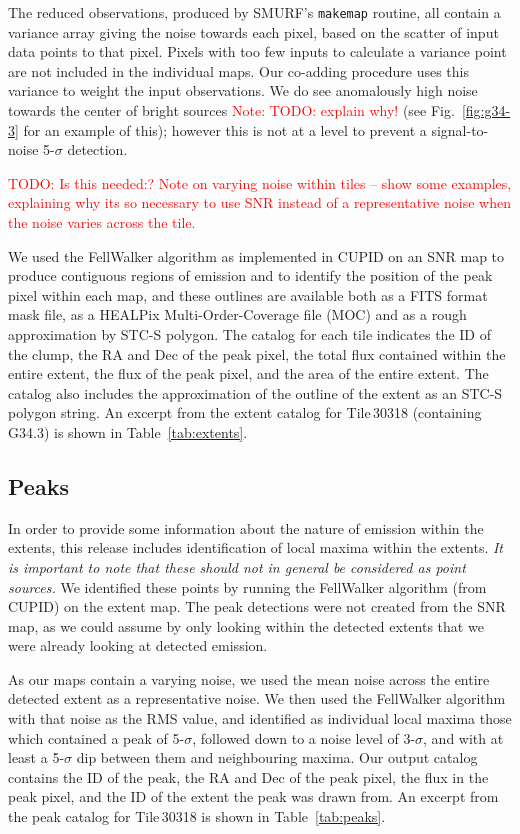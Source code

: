 \documentclass[twocolumn,times]{aastex6}
\newcommand{\todo}[1]{\textcolor{red}{TODO: #1}}
\newcommand{\note}[1]{\textcolor{red}{Note: #1}}
\begin{document}
The reduced observations, produced by SMURF's \texttt{makemap} routine, all
contain a variance array giving the noise towards each pixel, based on
the scatter of input data points to that pixel. Pixels with too few
inputs to calculate a variance point are not included in
the individual maps. Our co-adding procedure uses this variance to
weight the input observations. We do see anomalously high noise
towards the center of bright sources \note{TODO: explain why!} (see
Fig.~\ref{fig:g34-3} for an example of this); however this is not at a
level to prevent a signal-to-noise 5-$\sigma$ detection.

\todo{Is this needed:? Note on varying noise within tiles -- show some examples,
  explaining why its so necessary to use SNR instead of a
  representative noise when the noise varies across the tile.}

We used the FellWalker algorithm as implemented in CUPID on an SNR map
to produce contiguous regions of emission and to identify the position
of the peak pixel within each map, and these outlines are available
both as a FITS format mask file, as a HEALPix Multi-Order-Coverage
file (MOC) and as a rough approximation by STC-S polygon. The
catalog for each tile indicates the ID of the clump, the RA and Dec
of the peak pixel, the total flux contained within the entire extent,
the flux of the peak pixel, and the area of the entire extent. The
catalog also includes the approximation of the outline of the extent
as an STC-S polygon string. An excerpt from the extent catalog for
Tile\,30318 (containing G34.3) is shown in Table~\ref{tab:extents}.







\subsection{Peaks}
\label{sec:peaks}
In order to provide some information about the nature of emission
within the extents, this release includes identification of local
maxima within the extents. \emph{It is important to note that these
  should not in general be considered as point sources.} We identified
these points by running the FellWalker algorithm (from CUPID) on the
extent map. The peak detections were not created from the SNR map, as
we could assume by only looking within the detected extents that we
were already looking at detected emission.

As our maps contain a varying noise, we used the mean noise across the
entire detected extent as a representative noise. We then used the
FellWalker algorithm with that noise as the RMS value, and identified
as individual local maxima those which contained a peak of 5-$\sigma$,
followed down to a noise level of 3-$\sigma$, and with at least a
5-$\sigma$ dip between them and neighbouring maxima. Our output
catalog contains the ID of the peak, the RA and Dec of the peak
pixel, the flux in the peak pixel, and the ID of the extent the peak
was drawn from. An excerpt from the peak catalog for Tile\,30318 is
shown in Table~\ref{tab:peaks}.
\end{document}
